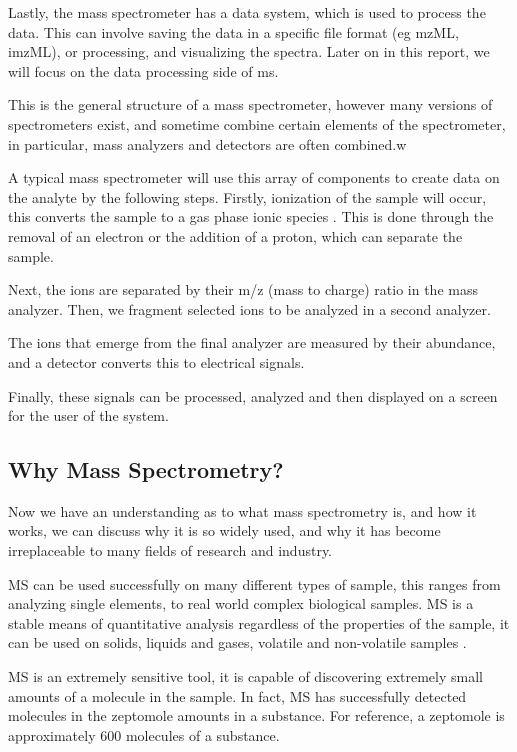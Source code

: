 \documentclass[11pt,openany]{book}
\begin{document}
Lastly, the mass spectrometer has a data system, which is used to process the data. This can involve saving the data in a specific file format (eg mzML, imzML), or processing, and visualizing the spectra. Later on in this report, we will focus on the data processing side of \acrshort{ms}.

This is the general structure of a mass spectrometer, however many versions of spectrometers exist, and sometime combine certain elements of the spectrometer, in particular, mass analyzers and detectors are often combined.w

A typical mass spectrometer will use this array of components to create data on the analyte by the following steps. Firstly, ionization of the sample will occur, this converts the sample to a gas phase ionic species \cite{fund_contemp_MS_book}. This is done through the removal of an electron or the addition of a proton, which can separate the sample.

Next, the ions are separated by their m/z (mass to charge) ratio in the mass analyzer. Then, we fragment selected ions to be analyzed in a second analyzer. 

The ions that emerge from the final analyzer are measured by their abundance, and a detector converts this to electrical signals.

Finally, these signals can be processed, analyzed and then displayed on a screen for the user of the system.

\subsection{Why Mass Spectrometry?}
Now we have an understanding as to what mass spectrometry is, and how it works, we can discuss why it is so widely used, and why it has become irreplaceable to many fields of research and industry.

MS can be used successfully on many different types of sample, this ranges from analyzing single elements, to real world complex biological samples. MS is a stable means of quantitative analysis regardless of the properties of the sample, it can be used on solids, liquids and gases, volatile and non-volatile samples \cite{fund_contemp_MS_book}.

MS is an extremely sensitive tool, it is capable of discovering extremely small amounts of a molecule in the sample. In fact, MS has successfully detected molecules in the zeptomole amounts in a substance. For reference, a zeptomole is approximately 600 molecules of a substance.
\end{document}

